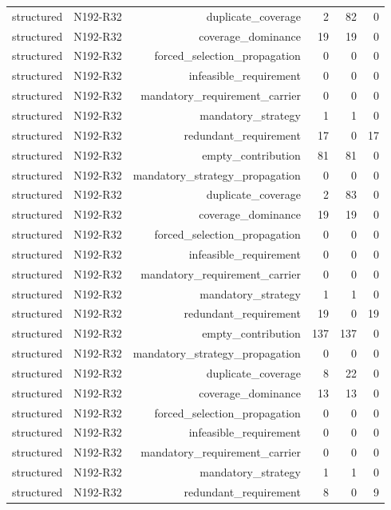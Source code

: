 {\begin{longtable}{lrrrrr}
structured & N192-R32 & duplicate\_coverage & 2 & 82 & 0 \\
structured & N192-R32 & coverage\_dominance & 19 & 19 & 0 \\
structured & N192-R32 & forced\_selection\_propagation & 0 & 0 & 0 \\
structured & N192-R32 & infeasible\_requirement & 0 & 0 & 0 \\
structured & N192-R32 & mandatory\_requirement\_carrier & 0 & 0 & 0 \\
structured & N192-R32 & mandatory\_strategy & 1 & 1 & 0 \\
structured & N192-R32 & redundant\_requirement & 17 & 0 & 17 \\
structured & N192-R32 & empty\_contribution & 81 & 81 & 0 \\
structured & N192-R32 & mandatory\_strategy\_propagation & 0 & 0 & 0 \\
structured & N192-R32 & duplicate\_coverage & 2 & 83 & 0 \\
structured & N192-R32 & coverage\_dominance & 19 & 19 & 0 \\
structured & N192-R32 & forced\_selection\_propagation & 0 & 0 & 0 \\
structured & N192-R32 & infeasible\_requirement & 0 & 0 & 0 \\
structured & N192-R32 & mandatory\_requirement\_carrier & 0 & 0 & 0 \\
structured & N192-R32 & mandatory\_strategy & 1 & 1 & 0 \\
structured & N192-R32 & redundant\_requirement & 19 & 0 & 19 \\
structured & N192-R32 & empty\_contribution & 137 & 137 & 0 \\
structured & N192-R32 & mandatory\_strategy\_propagation & 0 & 0 & 0 \\
structured & N192-R32 & duplicate\_coverage & 8 & 22 & 0 \\
structured & N192-R32 & coverage\_dominance & 13 & 13 & 0 \\
structured & N192-R32 & forced\_selection\_propagation & 0 & 0 & 0 \\
structured & N192-R32 & infeasible\_requirement & 0 & 0 & 0 \\
structured & N192-R32 & mandatory\_requirement\_carrier & 0 & 0 & 0 \\
structured & N192-R32 & mandatory\_strategy & 1 & 1 & 0 \\
structured & N192-R32 & redundant\_requirement & 8 & 0 & 9 \\

\end{longtable}}
